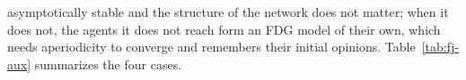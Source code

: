 asymptotically stable and the structure of the network does not matter; when it does
not, the agents it does not reach form an FDG model of their own, which needs
aperiodicity to converge and remembers their initial opinions.
Table~\ref{tab:fj-aux} summarizes the four cases.
